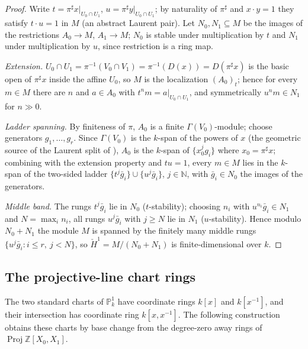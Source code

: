 \begin{proof}
  \leanok
  Write \(t = \pi^{\sharp} x|_{U_0 \cap U_1}\),
  \(u = \pi^{\sharp} y|_{U_0 \cap U_1}\); by naturality of \(\pi^{\sharp}\)
  and \(x \cdot y = 1\) they satisfy \(t \cdot u = 1\) in \(M\) (an
  abstract Laurent pair). Let \(N_0, N_1 \subseteq M\) be the images of
  the restrictions \(A_0 \to M\), \(A_1 \to M\); \(N_0\) is stable under
  multiplication by \(t\) and \(N_1\) under multiplication by \(u\),
  since restriction is a ring map.

  \emph{Extension.} \(U_0 \cap U_1 = \pi^{-1}(V_0 \cap V_1) =
  \pi^{-1}(D(x)) = D(\pi^{\sharp} x)\) is the basic open of
  \(\pi^{\sharp} x\) inside the affine \(U_0\), so \(M\) is the
  localization \((A_0)_t\); hence for every \(m \in M\) there are \(n\)
  and \(a \in A_0\) with \(t^n m = a|_{U_0 \cap U_1}\), and symmetrically
  \(u^n m \in N_1\) for \(n \gg 0\).

  \emph{Ladder spanning.} By finiteness of \(\pi\), \(A_0\) is a finite
  \(\Gamma(V_0)\)-module; choose generators \(g_1, \dots, g_r\). Since
  \(\Gamma(V_0)\) is the \(k\)-span of the powers of \(x\) (the geometric
  source of the Laurent split of ),
  \(A_0\) is the \(k\)-span of \(\{x_0^j g_i\}\) where
  \(x_0 = \pi^{\sharp} x\); combining with the extension property and
  \(tu = 1\), every \(m \in M\) lies in the \(k\)-span of the two-sided
  ladder \(\{t^j \bar{g}_i\} \cup \{u^j \bar{g}_i\}\), \(j \in
  \mathbb{N}\), with \(\bar{g}_i \in N_0\) the images of the generators.

  \emph{Middle band.} The rungs \(t^j \bar{g}_i\) lie in \(N_0\)
  (\(t\)-stability); choosing \(n_i\) with \(u^{n_i} \bar{g}_i \in N_1\)
  and \(N = \max_i n_i\), all rungs \(u^j \bar{g}_i\) with \(j \ge N\) lie
  in \(N_1\) (\(u\)-stability). Hence modulo \(N_0 + N_1\) the module
  \(M\) is spanned by the finitely many middle rungs
  \(\{u^j \bar{g}_i : i \le r,\ j < N\}\), so
  \(\check{H}^1 = M/(N_0 + N_1)\) is finite-dimensional over \(k\).
\end{proof}

\subsection{The projective-line chart rings}
\label{sec:RiemannRoch_Adelic_P1ChartData}

The two standard charts of \(\mathbb P^1_k\) have coordinate rings
\(k[x]\) and \(k[x^{-1}]\), and their intersection has coordinate ring
\(k[x,x^{-1}]\).  The following construction obtains these charts by
base change from the degree-zero away rings of
\(\operatorname{Proj}\mathbb Z[X_0,X_1]\).

